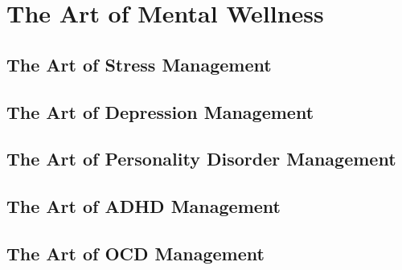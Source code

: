 \chapter{The Art of Mental Wellness}

\section{The Art of Stress Management}

\section{The Art of Depression Management}

\section{The Art of Personality Disorder Management}

\section{The Art of ADHD Management}

\section{The Art of OCD Management}
